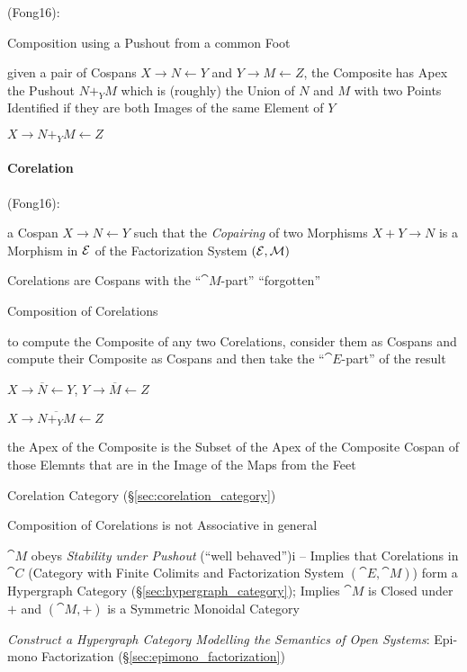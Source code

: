 (Fong16):

Composition using a Pushout from a common Foot

given a pair of Cospans $X \rightarrow N \leftarrow Y$ and $Y
\rightarrow M \leftarrow Z$, the Composite has Apex the Pushout $N +_Y
M$ which is (roughly) the Union of $N$ and $M$ with two Points
Identified if they are both Images of the same Element of $Y$

$X \rightarrow N +_Y M \leftarrow Z$



\paragraph{Corelation}\label{sec:corelation}\hfill

(Fong16):

a Cospan $X \rightarrow N \leftarrow Y$ such that the \emph{Copairing}
of two Morphisms $X + Y \rightarrow N$ is a Morphism in $\mathcal{E}$ of
the Factorization System $(\mathcal{E}, \mathcal{M})$ %

Corelations are Cospans with the ``$\cat{M}$-part'' ``forgotten''

Composition of Corelations

to compute the Composite of any two Corelations, consider them as
Cospans and compute their Composite as Cospans and then take the
``$\cat{E}$-part'' of the result %

$X \rightarrow \overline{N} \leftarrow Y$, $Y \rightarrow \overline{M}
\leftarrow Z$

$X \rightarrow \overline{N +_Y M} \leftarrow Z$

the Apex of the Composite is the Subset of the Apex of the Composite
Cospan of those Elemnts that are in the Image of the Maps from the
Feet %

Corelation Category (\S\ref{sec:corelation_category})

Composition of Corelations is not Associative in general

$\cat{M}$ obeys \emph{Stability under Pushout} (``well behaved'')i --
Implies that Corelations in $\cat{C}$ (Category with Finite Colimits
and Factorization System $(\cat{E},\cat{M})$) form a Hypergraph
Category (\S\ref{sec:hypergraph_category}); Implies $\cat{M}$ is
Closed under $+$ and $(\cat{M},+)$ is a Symmetric Monoidal Category

\emph{Construct a Hypergraph Category Modelling the Semantics of Open
  Systems}: Epi-mono Factorization (\S\ref{sec:epimono_factorization})

